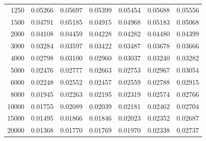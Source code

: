 \documentclass[10pt,a4paper]{article}
\begin{document}
\begin{longtable}{rrrrrrr}
1250&0.05266&0.05697&0.05399&0.05454&0.05688&0.05556\\
1500&0.04791&0.05185&0.04915&0.04968&0.05183&0.05068\\
2000&0.04108&0.04459&0.04228&0.04282&0.04480&0.04399\\
3000&0.03284&0.03597&0.03422&0.03487&0.03678&0.03666\\
4000&0.02798&0.03100&0.02960&0.03037&0.03240&0.03282\\
5000&0.02476&0.02777&0.02663&0.02753&0.02967&0.03054\\
6000&0.02248&0.02552&0.02457&0.02559&0.02788&0.02915\\
8000&0.01945&0.02263&0.02195&0.02319&0.02574&0.02766\\
10000&0.01755&0.02089&0.02039&0.02181&0.02462&0.02704\\
15000&0.01495&0.01866&0.01846&0.02023&0.02352&0.02687\\
20000&0.01368&0.01770&0.01769&0.01970&0.02338&0.02737\\
\end{longtable}
\normalsize
\end{document}

